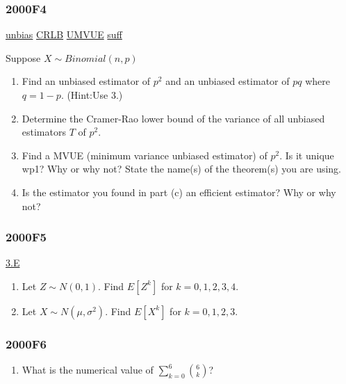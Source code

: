 \documentclass[10pt,twocolumn,portrait]{article}
\providecommand{\tightlist}{%
  \setlength{\itemsep}{0pt}\setlength{\parskip}{0pt}}
\begin{document}
\hypertarget{f4}{%
\subsubsection{2000F4}\label{f4}}

\protect\hyperlink{section-4}{unbias}
\protect\hyperlink{section-5}{CRLB} \protect\hyperlink{section-5}{UMVUE}
\protect\hyperlink{section-6}{suff}

Suppose \(X\sim Binomial(n,p)\)

\begin{enumerate}
\def\labelenumi{\Alph{enumi})}
\item
  Find an unbiased estimator of \(p^2\) and an unbiased estimator of
  \(pq\) where \(q=1-p\). (Hint:Use 3.)
\item
  Determine the Cramer-Rao lower bound of the variance of all unbiased
  estimators \(T\) of \(p^2\).
\item
  Find a MVUE (minimum variance unbiased estimator) of \(p^2\). Is it
  unique wp1? Why or why not? State the name(s) of the theorem(s) you
  are using.
\item
  Is the estimator you found in part (c) an efficient estimator? Why or
  why not?
\end{enumerate}

\hypertarget{f5}{%
\subsubsection{2000F5}\label{f5}}

\protect\hyperlink{e}{3.E}

\begin{enumerate}
\def\labelenumi{\Alph{enumi})}
\item
  Let \(Z\sim N(0, 1)\). Find \(E[Z^k]\) for \(k=0,1,2,3,4\).
\item
  Let \(X\sim N(\mu,\sigma^2)\). Find \(E[X^k]\) for \(k=0,1,2,3\).
\end{enumerate}

\hypertarget{f6}{%
\subsubsection{2000F6}\label{f6}}

\begin{enumerate}
\def\labelenumi{\Alph{enumi})}
\tightlist
\item
  What is the numerical value of \(\sum_{k=0}^6\binom{6}{k}\)?
\end{enumerate}
\end{document}
